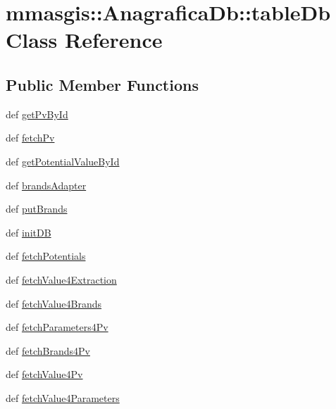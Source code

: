 \hypertarget{classmmasgis_1_1AnagraficaDb_1_1tableDb}{
\section{mmasgis::AnagraficaDb::tableDb Class Reference}
\label{classmmasgis_1_1AnagraficaDb_1_1tableDb}
}
\subsection*{Public Member Functions}
\begin{DoxyCompactItemize}
\item 
def \hyperlink{classmmasgis_1_1AnagraficaDb_1_1tableDb_a8185b13eec8fc0de7cc5783de47357b2}{getPvById}
\item 
def \hyperlink{classmmasgis_1_1AnagraficaDb_1_1tableDb_a5800aa32da42292a3c1c632a3f54ac35}{fetchPv}
\item 
def \hyperlink{classmmasgis_1_1AnagraficaDb_1_1tableDb_a96697cffa51e3ba5dfe475576eea98c4}{getPotentialValueById}
\item 
def \hyperlink{classmmasgis_1_1AnagraficaDb_1_1tableDb_a177327adf8930a74bad36ebb711d03e2}{brandsAdapter}
\item 
def \hyperlink{classmmasgis_1_1AnagraficaDb_1_1tableDb_aae535ddf44a1bc2a332341fc354986ec}{putBrands}
\item 
def \hyperlink{classmmasgis_1_1AnagraficaDb_1_1tableDb_abacffb176c34c881ea81c4190fab2474}{initDB}
\item 
def \hyperlink{classmmasgis_1_1AnagraficaDb_1_1tableDb_a435bb4aea8bbda13b989ab44d791ec8d}{fetchPotentials}
\item 
def \hyperlink{classmmasgis_1_1AnagraficaDb_1_1tableDb_a695c39e8a2638e93f5c56a39785c1194}{fetchValue4Extraction}
\item 
def \hyperlink{classmmasgis_1_1AnagraficaDb_1_1tableDb_a6959b8394430805a15bd76d41aaf67d2}{fetchValue4Brands}
\item 
def \hyperlink{classmmasgis_1_1AnagraficaDb_1_1tableDb_a0c498ea3b23582ab9c596c575e822120}{fetchParameters4Pv}
\item 
def \hyperlink{classmmasgis_1_1AnagraficaDb_1_1tableDb_aa2c8f57f61bf875f7dd4b217b382cea0}{fetchBrands4Pv}
\item 
def \hyperlink{classmmasgis_1_1AnagraficaDb_1_1tableDb_a8998897acf7e9295f5b756869c2046bd}{fetchValue4Pv}
\item 
def \hyperlink{classmmasgis_1_1AnagraficaDb_1_1tableDb_ad3bf925023f5afce5401f2830067a133}{fetchValue4Parameters}

\end{DoxyCompactItemize}
